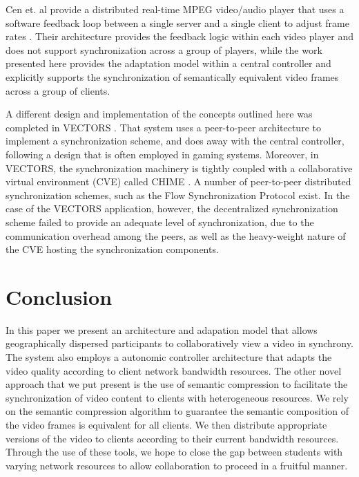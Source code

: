 \documentclass{sig-alternate}
\begin{document}
Cen et. al provide a distributed real-time MPEG video/audio player
that uses a software feedback loop between a single server and a
single client to adjust frame rates \cite{CEN}.  Their architecture
provides the feedback logic within each video player and does not
support synchronization across a group of players, while the work
presented here provides the adaptation model within a central
controller and explicitly supports the synchronization of semantically
equivalent video frames across a group of clients.

A different design and implementation of the concepts outlined here
was completed in VECTORS \cite{VECTORS}.  That system uses a
peer-to-peer architecture to implement a synchronization scheme, and
does away with the central controller, following a design that is
often employed in gaming systems.  Moreover, in VECTORS, the
synchronization machinery is tightly coupled with a collaborative
virtual environment (CVE) called CHIME \cite{CHIME}.  A number of
peer-to-peer distributed synchronization schemes, such as the Flow
Synchronization Protocol \cite{FSP} exist.  In the case of the VECTORS
application, however, the decentralized synchronization scheme failed
to provide an adequate level of synchronization, due to the
communication overhead among the peers, as well as the heavy-weight
nature of the CVE hosting the synchronization components.

\section{Conclusion}

In this paper we present an architecture and adapation model that
allows geographically dispersed participants to collaboratively view a
video in synchrony.  The system also employs a autonomic controller
architecture that adapts the video quality according to client network
bandwidth resources.  The other novel approach that we put present is
the use of semantic compression to facilitate the synchronization of
video content to clients with heterogeneous resources.  We rely on the
semantic compression algorithm to guarantee the semantic composition
of the video frames is equivalent for all clients.  We then distribute
appropriate versions of the video to clients according to their
current bandwidth resources.  Through the use of these tools, we hope
to close the gap between students with varying network resources to
allow collaboration to proceed in a fruitful manner.

\end{document}
